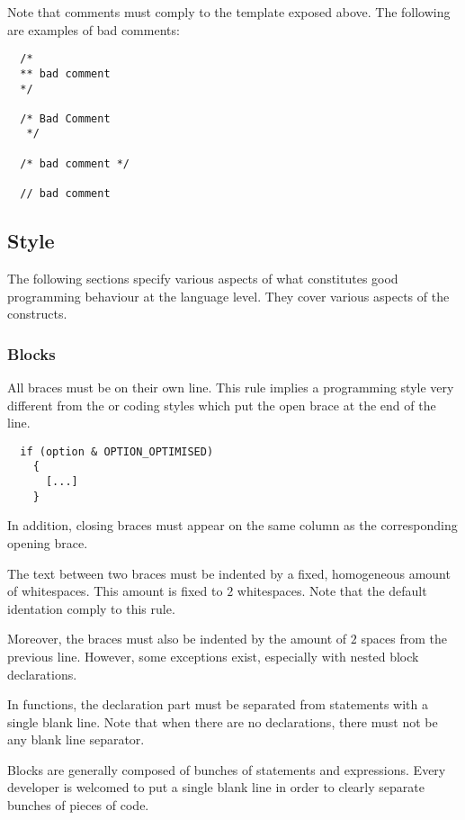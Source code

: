 Note that comments must comply to the template exposed above. The following
are examples of bad comments:

\begin{verbatim}
  /*
  ** bad comment
  */

  /* Bad Comment
   */

  /* bad comment */

  // bad comment
\end{verbatim}

%
%

\subsection{Style}

The following sections specify various aspects of what constitutes good
programming behaviour at the language level. They cover various aspects
of the  constructs.


\subsubsection{Blocks}

All braces must be on their own line. This rule implies a programming style
very different from the  or  coding styles which
put the open brace at the end of the line.

\begin{verbatim}
  if (option & OPTION_OPTIMISED)
    {
      [...]
    }
\end{verbatim}

In addition, closing braces must appear on the same column as the
corresponding opening brace.

The text between two braces must be indented by a fixed, homogeneous amount
of whitespaces. This amount is fixed to $2$ whitespaces. Note that
the  default identation comply to this rule.

Moreover, the braces must also be indented by the amount of $2$
spaces from the previous line. However, some exceptions exist, especially
with nested block declarations.

In  functions, the declaration part must be separated from statements
with a single blank line. Note that when there are no declarations, there
must not be any blank line separator.

Blocks are generally composed of bunches of statements and expressions. Every
developer is welcomed to put a single blank line in order to clearly separate
bunches of pieces of code.

